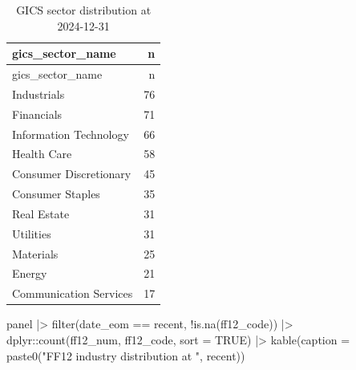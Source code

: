 \documentclass[
  letterpaper,
  DIV=11,
  numbers=noendperiod]{scrartcl}
\newenvironment{Shaded}{\begin{snugshade}}{\end{snugshade}}
\newcommand{\AttributeTok}[1]{\textcolor[rgb]{0.40,0.45,0.13}{#1}}
\newcommand{\ConstantTok}[1]{\textcolor[rgb]{0.56,0.35,0.01}{#1}}
\newcommand{\FunctionTok}[1]{\textcolor[rgb]{0.28,0.35,0.67}{#1}}
\newcommand{\NormalTok}[1]{\textcolor[rgb]{0.00,0.23,0.31}{#1}}
\newcommand{\OtherTok}[1]{\textcolor[rgb]{0.00,0.23,0.31}{#1}}
\newcommand{\SpecialCharTok}[1]{\textcolor[rgb]{0.37,0.37,0.37}{#1}}
\newcommand{\StringTok}[1]{\textcolor[rgb]{0.13,0.47,0.30}{#1}}
\begin{document}
\begin{Shaded}
\end{Shaded}

\begin{longtable}[]{@{}lr@{}}
\caption{GICS sector distribution at 2024-12-31}\tabularnewline
\toprule\noalign{}
gics\_sector\_name & n \\
\midrule\noalign{}
\endfirsthead
\toprule\noalign{}
gics\_sector\_name & n \\
\midrule\noalign{}
\endhead
\bottomrule\noalign{}
\endlastfoot
Industrials & 76 \\
Financials & 71 \\
Information Technology & 66 \\
Health Care & 58 \\
Consumer Discretionary & 45 \\
Consumer Staples & 35 \\
Real Estate & 31 \\
Utilities & 31 \\
Materials & 25 \\
Energy & 21 \\
Communication Services & 17 \\
\end{longtable}

\begin{Shaded}
\begin{Highlighting}[]
\NormalTok{panel }\SpecialCharTok{|\textgreater{}}
  \FunctionTok{filter}\NormalTok{(date\_eom }\SpecialCharTok{==}\NormalTok{ recent, }\SpecialCharTok{!}\FunctionTok{is.na}\NormalTok{(ff12\_code)) }\SpecialCharTok{|\textgreater{}}
\NormalTok{  dplyr}\SpecialCharTok{::}\FunctionTok{count}\NormalTok{(ff12\_num, ff12\_code, }\AttributeTok{sort =} \ConstantTok{TRUE}\NormalTok{) }\SpecialCharTok{|\textgreater{}}
  \FunctionTok{kable}\NormalTok{(}\AttributeTok{caption =} \FunctionTok{paste0}\NormalTok{(}\StringTok{"FF12 industry distribution at "}\NormalTok{, recent))}
\end{Highlighting}
\end{Shaded}
\end{document}

